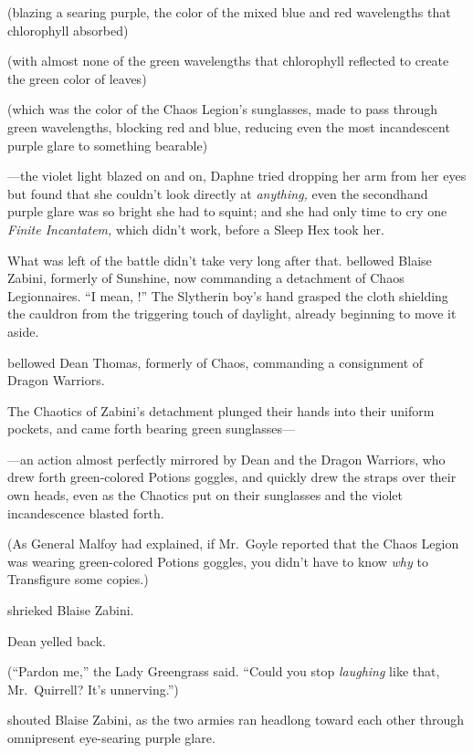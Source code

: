 (blazing a searing purple, the color of the mixed blue and red
wavelengths that chlorophyll absorbed)

(with almost none of the green wavelengths that chlorophyll
reflected to create the green color of leaves)

(which was the color of the Chaos Legion’s sunglasses, made to
pass through green wavelengths, blocking red and blue, reducing
even the most incandescent purple glare to something bearable)

—the violet light blazed on and on, Daphne tried dropping her
arm from her eyes but found that she couldn’t look directly at
\emph{anything,} even the secondhand purple glare was so bright she
had to squint; and she had only time to cry one \emph{Finite
Incantatem,} which didn’t work, before a Sleep Hex took her.

What was left of the battle didn’t take very long after
that.
\sbreak
{} bellowed Blaise Zabini, formerly of Sunshine, now
commanding a detachment of Chaos Legionnaires. “I mean, !”
The Slytherin boy’s hand grasped the cloth shielding the cauldron
from the triggering touch of daylight, already beginning to move it
aside.

 bellowed Dean Thomas, formerly of Chaos, commanding a
consignment of Dragon Warriors. 

The Chaotics of Zabini’s detachment plunged their hands into
their uniform pockets, and came forth bearing green sunglasses—


—an action almost perfectly mirrored by Dean and the Dragon
Warriors, who drew forth green-colored Potions goggles, and quickly
drew the straps over their own heads, even as the Chaotics put on
their sunglasses and the violet incandescence blasted forth.

(As General Malfoy had explained, if Mr.~Goyle reported that the
Chaos Legion was wearing green-colored Potions goggles, you didn’t
have to know \emph{why} to Transfigure some copies.)

 shrieked Blaise Zabini.

 Dean yelled back. 

(“Pardon me,” the Lady Greengrass said. “Could you stop
\emph{laughing} like that, Mr.~Quirrell? It’s unnerving.”)

 shouted Blaise Zabini, as the two armies
ran headlong toward each other through omnipresent eye-searing
purple glare. 

